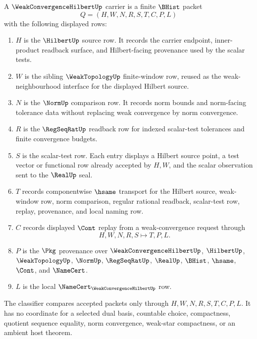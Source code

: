 \begin{definition}
\label{def:weak-convergence-hilbert-carrier}
A $\WeakConvergenceHilbertUp$ carrier is a finite $\BHist$ packet
$$
Q=(H,W,N,R,S,T,C,P,L)
$$
with the following displayed rows:
\begin{enumerate}
\item $H$ is the $\HilbertUp$ source row. It records the carrier endpoint, inner-product readback surface, and Hilbert-facing provenance used by the scalar tests.
\item $W$ is the sibling $\WeakTopologyUp$ finite-window row, reused as the weak-neighbourhood interface for the displayed Hilbert source.
\item $N$ is the $\NormUp$ comparison row. It records norm bounds and norm-facing tolerance data without replacing weak convergence by norm convergence.
\item $R$ is the $\RegSeqRatUp$ readback row for indexed scalar-test tolerances and finite convergence budgets.
\item $S$ is the scalar-test row. Each entry displays a Hilbert source point, a test vector or functional row already accepted by $H,W$, and the scalar observation sent to the $\RealUp$ seal.
\item $T$ records componentwise $\hsame$ transport for the Hilbert source, weak-window row, norm comparison, regular rational readback, scalar-test row, replay, provenance, and local naming row.
\item $C$ records displayed $\Cont$ replay from a weak-convergence request through
$$
H,W,N,R,S \longmapsto T,P,L .
$$
\item $P$ is the $\Pkg$ provenance over $\WeakConvergenceHilbertUp$, $\HilbertUp$, $\WeakTopologyUp$, $\NormUp$, $\RegSeqRatUp$, $\RealUp$, $\BHist$, $\hsame$, $\Cont$, and $\NameCert$.
\item $L$ is the local $\NameCert_{\WeakConvergenceHilbertUp}$ row.
\end{enumerate}
The classifier compares accepted packets only through $H,W,N,R,S,T,C,P,L$. It has no coordinate for a selected dual basis, countable choice, compactness, quotient sequence equality, norm convergence, weak-star compactness, or an ambient host theorem.
\end{definition}

